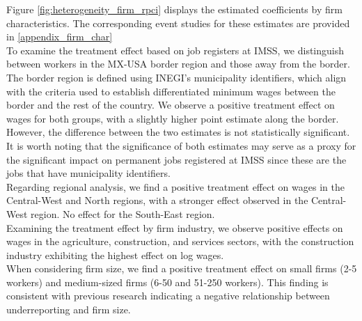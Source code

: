 \documentclass[10pt, oneside]{book}
\begin{document}
Figure \ref{fig:heterogeneity_firm_rpci} displays the estimated coefficients by firm characteristics. The corresponding event studies for these estimates are provided in \ref{appendix_firm_char} \\

To examine the treatment effect based on job registers at IMSS, we distinguish between workers in the MX-USA border region and those away from the border. The border region is defined using INEGI's municipality identifiers, which align with the criteria used to establish differentiated minimum wages between the border and the rest of the country. We observe a positive treatment effect on wages for both groups, with a slightly higher point estimate along the border. However, the difference between the two estimates is not statistically significant. It is worth noting that the significance of both estimates may serve as a proxy for the significant impact on permanent jobs registered at IMSS since these are the jobs that have municipality identifiers. \\

Regarding regional analysis, we find a positive treatment effect on wages in the Central-West and North regions, with a stronger effect observed in the Central-West region. No effect for the South-East region. \\

Examining the treatment effect by firm industry, we observe positive effects on wages in the agriculture, construction, and services sectors, with the construction industry exhibiting the highest effect on log wages. \\

When considering firm size, we find a positive treatment effect on small firms (2-5 workers) and medium-sized firms (6-50 and 51-250 workers). This finding is consistent with previous research indicating a negative relationship between underreporting and firm size. \\
\end{document}
